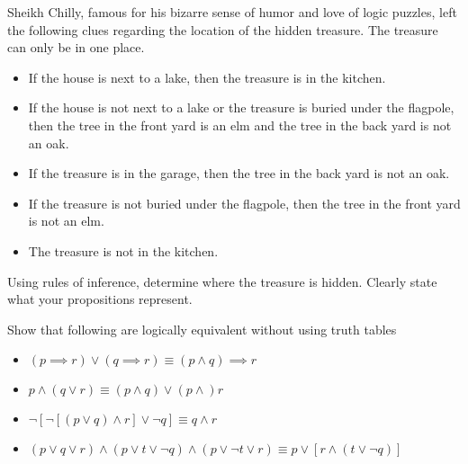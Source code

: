 \documentclass[addpoints]{exam}
\newenvironment{problem}[2][Problem]{\begin{trivlist}
    \item[\hskip \labelsep {\bfseries #1}\hskip \labelsep {\bfseries #2.}]}{\end{trivlist}}
\begin{document}
\begin{problem}{6}
Sheikh Chilly, famous for his bizarre sense of humor and love of logic puzzles, left the following clues
regarding the location of the hidden treasure. The treasure can only be in one place.
\begin{itemize}
    \item If the house is next to a lake, then the treasure is in the kitchen.
    \item If the house is not next to a lake or the treasure is buried under the flagpole, then the tree in the front yard is an elm and the tree in the back yard is not an oak.
    \item If the treasure is in the garage, then the tree in the back yard is not an oak.
    \item If the treasure is not buried under the flagpole, then the tree in the front yard is not an elm.
    \item The treasure is not in the kitchen.
\end{itemize}
Using rules of inference, determine where the treasure is hidden. Clearly state what your propositions
represent.
\end{problem}

\begin{questions}
    \question
    \begin{solution}
        
    \end{solution}
\end{questions}

\begin{problem}{7}
Show that following are logically equivalent without using truth tables
\begin{itemize}
    \item[(a)] $ (p \implies r) \lor (q \implies r)  \equiv  (p \land q) \implies r $
    \item[(b)] $ p \land (q \lor r) \equiv (p \land q) \lor (p \land) r $
    \item[(c)] $ \neg [\neg[(p \lor q) \land r] \lor \neg q] \equiv q \land r $
        \item[(d)]$ (p \lor q \lor r) \land (p \lor t \lor \neg q) \land (p \lor \neg t \lor r) \equiv p \lor [r \land (t \lor \neg q)] $
\end{itemize}

\end{problem}

\begin{questions}
    \question
    \begin{solution}
        
    \end{solution}
\end{questions}
\end{document}
